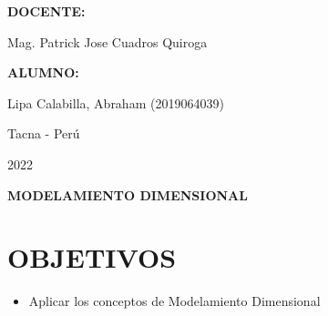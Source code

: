 \documentclass[12pt,letterpaper]{article}
\begin{document}
\begin{titlepage}
\begin{center}
        \vspace*{0.2in}
        \begin{Large}
            \textbf{DOCENTE:} \\
        \end{Large}
        \vspace*{0.1in}
        \begin{large}
            Mag. Patrick Jose Cuadros Quiroga\\
        \end{large}
        \vspace*{0.3in}
        \begin{large}
            \textbf{ALUMNO:} \\
            \begin{flushleft}
                Lipa Calabilla, Abraham  		\hfill	(2019064039) \\
            \end{flushleft}
        \end{large}
        \vspace*{1.3in}
        \begin{large}
            Tacna - Perú\\
        \end{large}
        \vspace*{0.1in}
        \begin{large}
            2022\\
        \end{large}
    \end{center}
\end{titlepage}

\newpage
\tableofcontents
\justify
\newpage
\begin{LARGE}
    \begin{center}
        \textbf{MODELAMIENTO DIMENSIONAL} \\
    \end{center}
\end{LARGE}
\section{OBJETIVOS}
\begin{itemize}
    \item Aplicar los conceptos de Modelamiento Dimensional
\end{itemize}
\end{document}
